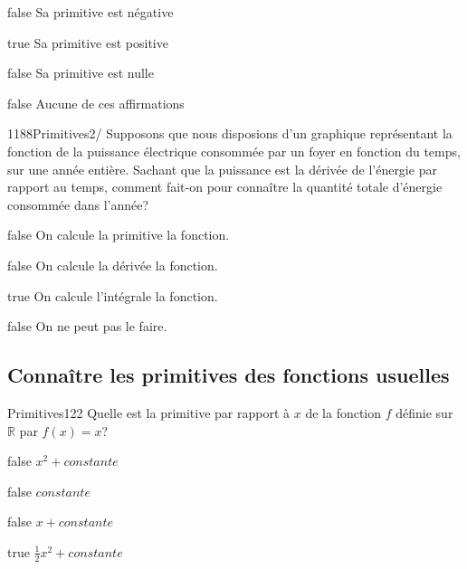 \documentclass[11pt]{article}
\begin{document}
            \begin{reponses}
                \item[false] Sa primitive est négative
                \item[true] Sa primitive est positive
                \item[false] Sa primitive est nulle
                \item[false] Aucune de ces affirmations
            \end{reponses}

            \begin{question}{1188}{Primitives}{2}{/}
                Supposons que nous disposions d'un graphique représentant la fonction de la puissance électrique consommée par un foyer en fonction du temps, sur une année entière. Sachant que la puissance est la dérivée de l'énergie par rapport au temps, comment fait-on pour connaître la quantité totale d'énergie consommée dans l'année?
            \end{question}

            \begin{reponses}
                \item[false] On calcule la primitive la fonction.
                \item[false] On calcule la dérivée la fonction.
                \item[true] On calcule l'intégrale la fonction.
                \item[false] On ne peut pas le faire.
            \end{reponses}

        \subsection{Connaître les primitives des fonctions usuelles}
        
        	\begin{question}{61}{Primitives}{1}{22}
				Quelle est la primitive par rapport à $x$ de la fonction $f$ définie sur $\mathbb{R}$ par $f(x)=x$?
            \end{question}

            \begin{reponses}
            	\item[false] $x^2+constante$
            	\item[false] $constante$
                \item[false] $x+constante$
                \item[true] $\frac{1}{2}x^2+constante$
            \end{reponses}
        
\end{document}
